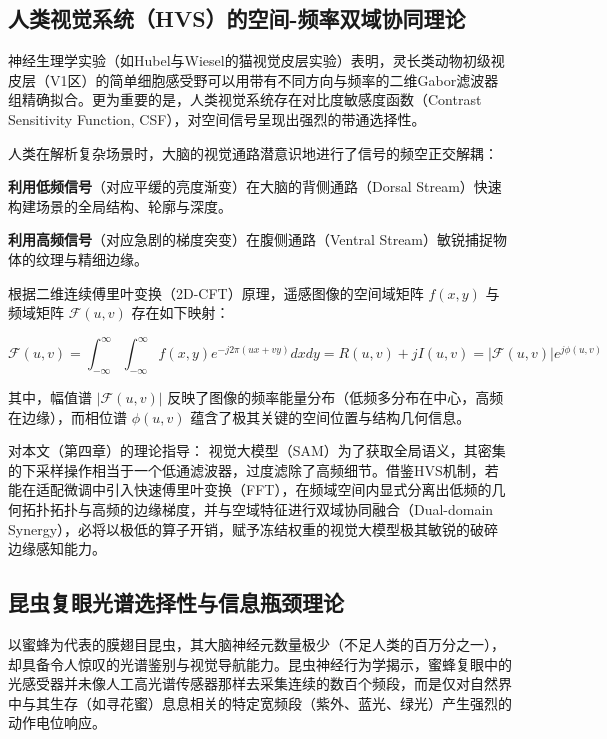 \subsection{人类视觉系统（HVS）的空间-频率双域协同理论}

神经生理学实验（如Hubel与Wiesel的猫视觉皮层实验）表明，灵长类动物初级视皮层（V1区）的简单细胞感受野可以用带有不同方向与频率的二维Gabor滤波器组精确拟合。更为重要的是，人类视觉系统存在对比度敏感度函数（Contrast Sensitivity Function, CSF），对空间信号呈现出强烈的带通选择性。

人类在解析复杂场景时，大脑的视觉通路潜意识地进行了信号的频空正交解耦：

\textbf{利用低频信号}（对应平缓的亮度渐变）在大脑的背侧通路（Dorsal Stream）快速构建场景的全局结构、轮廓与深度。

\textbf{利用高频信号}（对应急剧的梯度突变）在腹侧通路（Ventral Stream）敏锐捕捉物体的纹理与精细边缘。

根据二维连续傅里叶变换（2D-CFT）原理，遥感图像的空间域矩阵 $f(x,y)$ 与频域矩阵 $\mathcal{F}(u,v)$ 存在如下映射：

\begin{equation}
\mathcal{F}(u,v) = \int_{-\infty}^{\infty} \int_{-\infty}^{\infty} f(x,y) e^{-j 2\pi (ux+vy)} dx dy = R(u,v) + j I(u,v) = |\mathcal{F}(u,v)| e^{j \phi(u,v)}
\end{equation}

其中，幅值谱 $|\mathcal{F}(u,v)|$ 反映了图像的频率能量分布（低频多分布在中心，高频在边缘），而相位谱 $\phi(u,v)$ 蕴含了极其关键的空间位置与结构几何信息。

对本文（第四章）的理论指导： 视觉大模型（SAM）为了获取全局语义，其密集的下采样操作相当于一个低通滤波器，过度滤除了高频细节。借鉴HVS机制，若能在适配微调中引入快速傅里叶变换（FFT），在频域空间内显式分离出低频的几何拓扑拓扑与高频的边缘梯度，并与空域特征进行双域协同融合（Dual-domain Synergy），必将以极低的算子开销，赋予冻结权重的视觉大模型极其敏锐的破碎边缘感知能力。

\subsection{昆虫复眼光谱选择性与信息瓶颈理论}

以蜜蜂为代表的膜翅目昆虫，其大脑神经元数量极少（不足人类的百万分之一），却具备令人惊叹的光谱鉴别与视觉导航能力。昆虫神经行为学揭示，蜜蜂复眼中的光感受器并未像人工高光谱传感器那样去采集连续的数百个频段，而是仅对自然界中与其生存（如寻花蜜）息息相关的特定宽频段（紫外、蓝光、绿光）产生强烈的动作电位响应。

